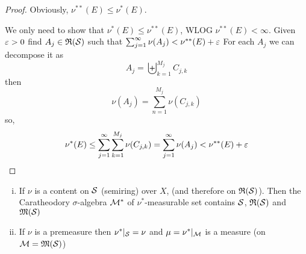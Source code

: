 \begin{proof}
  Obviously, $\nu^{**}(E) \le \nu^*(E)$. 

  We only need to show that $\nu^*(E) \le \nu^{**}(E)$, WLOG $\nu^{**}(E) < \infty$. 
  Given $\varepsilon > 0$ find $A_j \in \mathfrak R(\mathcal S)$ such that $\sum_{j=1}^\infty \nu(A_j) < \nu^{**}(E) + \varepsilon$
  For each $A_j$ we can decompose it as 
  \[A_j =\biguplus_{k=1}^{M_j} C_{j, k}\]
  then
  \[\nu(A_j) = \sum_{n=1}^{M_j} \nu(C_{j, k})\]
  so,
  \begin{align*}
    \nu^*(E) \le \sum_{j=1}^\infty\sum_{k=1}^{M_j} \nu(C_{j, k}) &= \sum_{j=1}^\infty \nu(A_j) < \nu^{**}(E) + \varepsilon \\
  \end{align*}  
\end{proof}

\begin{theorem} 
  \begin{enumerate}[(i)]
    \item If $\nu$ is a content on $\mathcal S$ (semiring) over $X$, (and therefore on $\mathfrak R(\mathcal S)$).  
      Then the Caratheodory $\sigma$-algebra $\mathcal M^*$ of $\nu^*$-measurable set contains $\mathcal S$,{ $\mathfrak R(\mathcal S)$} and $\mathfrak M(\mathcal S)$
    \item If $\nu$ is a premeasure then $\nu^*|_{\mathcal S} = \nu$
    and $\mu = \nu^*|_\mathcal M$ is a measure (on $\mathcal M=\mathfrak M(\mathcal S)$)
  \end{enumerate}
\end{theorem}


